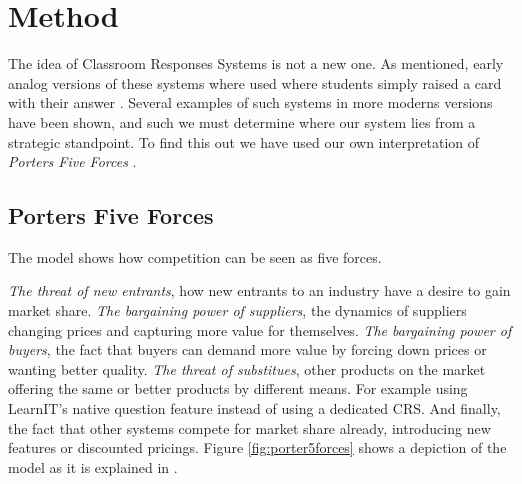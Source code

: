 \section{Method}



The idea of Classroom Responses Systems is not a new one. As mentioned, early analog versions of these systems where used where students simply raised a card with their answer \cite[p.~257]{stowell2007benefits}. Several examples of such systems in more moderns versions have been shown, and such we must determine where our system lies from a strategic standpoint. To find this out we have used our own interpretation of \emph{Porters Five Forces} \cite{porter1979competitive}.


\subsection{Porters Five Forces}
The model shows how competition can be seen as five forces. 

\emph{The threat of new entrants}, how new entrants to an industry have a desire to gain market share. \emph{The bargaining power of suppliers}, the dynamics of suppliers changing prices and capturing more value for themselves. \emph{The bargaining power of buyers}, the fact that buyers can demand more value by forcing down prices or wanting better quality. \emph{The threat of substitues}, other products on the market offering the same or better products by different means. For example using LearnIT's native question feature instead of using a dedicated CRS. And finally, the fact that other systems compete for market share already, introducing new features or discounted pricings. Figure \ref{fig:porter5forces} shows a depiction of the model as it is explained in . 


